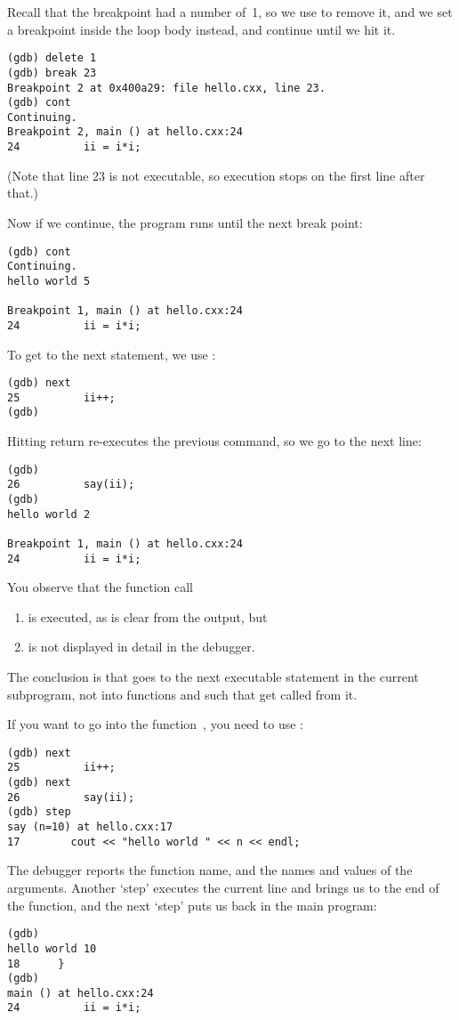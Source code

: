 Recall that the breakpoint had a number of~1, so we use  to remove it,
and we set a breakpoint inside the loop body instead,
and continue until we hit it.
\begin{lstlisting}
(gdb) delete 1
(gdb) break 23
Breakpoint 2 at 0x400a29: file hello.cxx, line 23.
(gdb) cont
Continuing.
Breakpoint 2, main () at hello.cxx:24
24          ii = i*i;
\end{lstlisting}
(Note that line 23 is not executable, so execution stops on the first line after that.)

Now if we continue, the program runs until the next break point:
\begin{lstlisting}
(gdb) cont
Continuing.
hello world 5

Breakpoint 1, main () at hello.cxx:24
24          ii = i*i;
\end{lstlisting}

To get to the next statement, we use :
\begin{verbatim}
(gdb) next
25          ii++;
(gdb)
\end{verbatim}

Hitting return re-executes the previous command,
so we go to the next line:
\begin{verbatim}
(gdb)
26          say(ii);
(gdb)
hello world 2

Breakpoint 1, main () at hello.cxx:24
24          ii = i*i;
\end{verbatim}

You observe that the function call
\begin{enumerate}
\item is executed, as is clear from the  output, but
\item is not displayed in detail in the debugger.
\end{enumerate}
The conclusion is that  goes to the next executable statement
in the current subprogram, not into functions and such that get called from it.

If you want to go into the function~, you need to use :
\begin{verbatim}
(gdb) next
25          ii++;
(gdb) next
26          say(ii);
(gdb) step
say (n=10) at hello.cxx:17
17        cout << "hello world " << n << endl;
\end{verbatim}
The debugger reports the function name, and the names and values of the arguments.
Another `step' executes the current line and brings us to the end of the function,
and the next `step' puts us back in the main program:
\begin{verbatim}
(gdb)
hello world 10
18      }
(gdb)
main () at hello.cxx:24
24          ii = i*i;
\end{verbatim}

